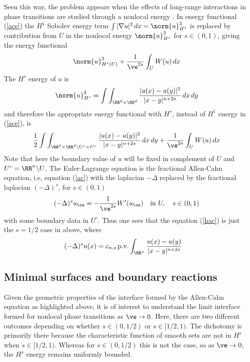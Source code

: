 Seen this way, the problem appears when the effects of long-range interactions in phase transitions are studied through a nonlocal energy \cite{msw, sv,sv1,svp}. In energy functional (\ref{ace}) the $H^1$ Sobolev energy term $\int |\nabla u|^2 \,dx=\norm{u}_{H^1}^2$ is replaced by contribution from $U$ in the nonlocal energy $\norm{u}_{H^s}^2$ for $s\in(0,1)$, giving the energy functional 
\begin{equation*}
    \norm{u}_{H^s(U)}^2  + \frac{1}{\ve ^{2s}}\int_U  W(u) \,dx
\end{equation*}
The $H^s$ energy of $u$ is 
$$\norm{u}_{H^s}^2 =\int \int _{\RR^d \times \RR^d} \frac{|u(x)-u(y)|^2}{|x-y|^{n+2s}} \,dx\,dy  $$
and therefore the appropriate energy functional with $H^s$, instead of $H^1$ energy in (\ref{ace}),  is 
\begin{equation} \label{nace}
    \frac{1}{2}\int \int _{\RR^d \times \RR^d \backslash U^c \times U^c} \frac{|u(x)-u(y)|^2}{|x-y|^{n+2s}} \,dx\,dy  + \frac{1}{\ve ^{2s}}\int_U  W(u) \,dx
\end{equation}
 Note that here the boundary value of $u$ will be fixed in complement of $U$ and $U^c=\RR^n \backslash U$. The Euler-Lagrange equation is the fractional Allen-Cahn equation, i.e, equation (\ref{ac}) with the laplacian $-\Delta$ replaced by the fractional laplacian $(-\Delta)^s$, for $s\in (0,1)$
\begin{equation}\label{nacs}
    (-\Delta)^{s} u_{\ve} = -\frac{1}{\ve ^{2s}} W'(u_{\ve})  \quad \text{in } U, \quad s\in(0,1)
\end{equation}
with some boundary data in $U^c$. Thus one sees that the equation (\ref{hac}) is just the $s=1/2$ case in above, where 
$$(-\Delta)^{s}u(x)= c_{n,s}\,{\rm p.v.} \int_{\RR^n} \frac{u(x)-u(y)}{|x-y|^{n+2s}} \quad $$

\subsection{Minimal surfaces and boundary reactions} Given the geometric properties of the interface formed by the Allen-Cahn equation as highlighted above, it is of interest to understand the limit interface formed for nonlocal phase transitions as $\ve \to 0$. Here, there are two different outcomes depending on whether $s\in(0,1/2)$ or $s\in [1/2,1).$ The dichotomy is primarily there because the characteristic function of smooth sets are not in $H^s$ when $s\in[1/2,1)$. Whereas for $s\in (0,1/2)$ this is not the case, so as $\ve \to 0$, the $H^s$ energy remains uniformly bounded. 



